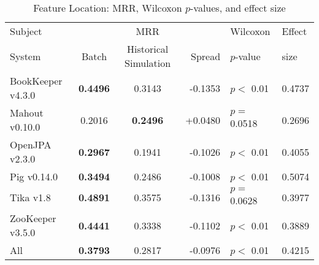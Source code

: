 \begin{table}[t]
\centering
\caption{Feature Location: MRR, Wilcoxon $p$-values, and effect size}
\begin{tabular}{l|ccr|ll}
\toprule
Subject & & MRR & & Wilcoxon & Effect \\
System  &  Batch & Historical Simulation & Spread & $p$-value & size \\
\midrule
BookKeeper v4.3.0 & {\bf 0.4496 } & 0.3143 & -0.1353 & $p < $ 0.01 & 0.4737 \\
Mahout v0.10.0 & 0.2016 & {\bf 0.2496 } & +0.0480 & $p = $ 0.0518 & 0.2696 \\
OpenJPA v2.3.0 & {\bf 0.2967 } & 0.1941 & -0.1026 & $p < $ 0.01 & 0.4055 \\
Pig v0.14.0 & {\bf 0.3494 } & 0.2486 & -0.1008 & $p < $ 0.01 & 0.5074 \\
Tika v1.8 & {\bf 0.4891 } & 0.3575 & -0.1316 & $p = $ 0.0628 & 0.3977 \\
ZooKeeper v3.5.0 & {\bf 0.4441 } & 0.3338 & -0.1102 & $p < $ 0.01 & 0.3889 \\
\midrule
All & {\bf 0.3793 } & 0.2817 & -0.0976 & $p < $ 0.01 & 0.4215 \\
\bottomrule
\end{tabular}
\label{table:feature_location_rq2}
\end{table}
